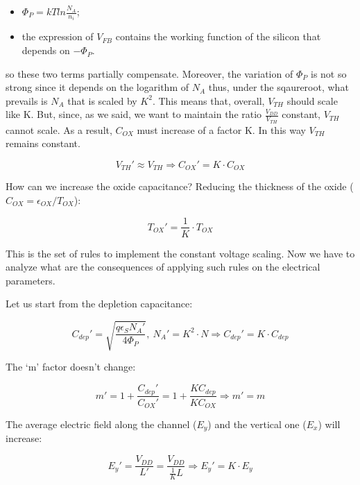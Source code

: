 \documentclass[a4paper, 12pt, twoside, openright]{report}
\begin{document}
{\begin{itemize}
\item $\Phi_P = kTln\frac{N_A}{n_i}$;
\item the expression of $V_{FB}$ contains the working function of the silicon that depends on $-\Phi_P$.
\end{itemize}

so these two terms partially compensate. Moreover, the variation of $\Phi_P$ is not so strong since it depends on the logarithm of $N_{A}$ thus, under the sqaureroot, what prevails is $N_{A}$ that is scaled by $K^{2}$. This means that, overall, $V_{TH}$ should scale like K. But, since, as we said, we want to maintain the ratio $\frac{V_{DD}}{V_{TH}}$ constant, $V_{TH}$ cannot scale. As a result, $C_{OX}$ must increase of a factor K. In this way $V_{TH}$ remains constant.

	\begin{equation}
	V_{TH}' \approx V_{TH} \Rightarrow C_{OX}' = K \cdot C_{OX}
	\label{}
	\end{equation}

How can we increase the oxide capacitance? Reducing the thickness of the oxide ($C_{OX} = \epsilon_{OX}/T_{OX}$):

	\begin{equation}
	T_{OX}' = \frac{1}{K} \cdot T_{OX}
	\label{}
	\end{equation}

This is the set of rules to implement the constant voltage scaling. Now we have to analyze what are the consequences of applying such rules on the electrical parameters.

Let us start from the depletion capacitance:

	\begin{equation}
	C_{dep}' = \sqrt{\frac{q\epsilon_S N_A'}{4\Phi_P}},\ N_A' = K^2 \cdot N \Rightarrow C_{dep}' = K \cdot C_{dep}
	\label{}
	\end{equation}

The `m' factor doesn't change:

	\begin{equation}
	m' = 1+\frac{C_{dep}'}{C_{OX}'} = 1+ \frac{KC_{dep}}{KC_{OX}} \Rightarrow m' = m
	\label{}
	\end{equation}

The average electric field along the channel ($E_{y}$) and the vertical one ($E_{x}$) will increase:

	\begin{equation}
	E_y' = \frac{V_{DD}}{L'} = \frac{V_{DD}}{\frac{1}{K}L} \Rightarrow E_y' = K \cdot E_y
	\label{}
	\end{equation}

}
\end{document}
